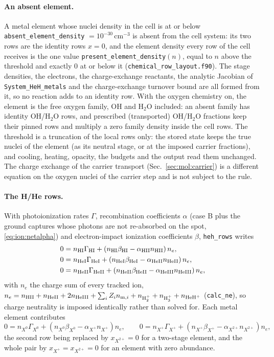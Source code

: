 \paragraph{An absent element.} A metal element whose nuclei density in the
cell is at or below \texttt{absent\_element\_density} $=10^{-30}$\,cm$^{-3}$
is absent from the cell system: its two rows are the identity rows $x=0$,
and the element density every row of the cell receives is the one value
\texttt{present\_element\_density}$(n)$, equal to $n$ above the threshold
and exactly 0 at or below it (\texttt{chemical\_row\_layout.f90}).  The stage
densities, the electrons, the charge-exchange reactants, the analytic
Jacobian of \texttt{System\_HeH\_metals} and the charge-exchange turnover
bound are all formed from it, so no reaction adds to an identity row.  With
the oxygen chemistry on, the element is the free oxygen family, OH and
H$_2$O included: an absent family has identity OH/H$_2$O rows, and
prescribed (transported) OH/H$_2$O fractions keep their pinned rows and
multiply a zero family density inside the cell rows.  The threshold is a
truncation of the local rows only: the stored state keeps the true nuclei of
the element (as its neutral stage, or at the imposed carrier fractions), and
cooling, heating, opacity, the budgets and the output read them unchanged.
The charge exchange of the carrier transport (Sec.~\ref{sec:mol:carrier})
is a different equation on the oxygen nuclei of the carrier step and is not
subject to the rule.

\paragraph{The H/He rows.} With photoionization rates $\Gamma$,
recombination coefficients $\alpha$ (case B plus the ground captures whose
photons are not re-absorbed on the spot, \eqref{eq:ion:netalpha}) and
electron-impact ionization coefficients $\beta$, \texttt{heh\_rows}
writes
\begin{align}
0 &= n_{\rm HI}\Gamma_{\rm HI}
   + \left(n_{\rm HI}\beta_{\rm HI}-\alpha_{\rm HII}n_{\rm HII}\right)n_e,
   \label{eq:ion:hrow}\\
0 &= n_{\rm HeI}\Gamma_{\rm HeI}
   + \left(n_{\rm HeI}\beta_{\rm HeI}-\alpha_{\rm HeII}n_{\rm HeII}\right)n_e,
   \label{eq:ion:herow}\\
0 &= n_{\rm HeII}\Gamma_{\rm HeII}
   + \left(n_{\rm HeII}\beta_{\rm HeII}-\alpha_{\rm HeIII}n_{\rm HeIII}\right)n_e,
   \label{eq:ion:he2row}
\end{align}
with $n_e$ the charge sum of every tracked ion,
$n_e = n_{\rm HII}+n_{\rm HeII}+2n_{\rm HeIII}+\sum_i Z_i n_{{\rm m},i}
 + n_{\rm H_2^+}+n_{\rm H_3^+}+n_{\rm HeH^+}$
(\texttt{calc\_ne}), so charge neutrality is imposed identically rather
than solved for. Each metal element contributes
\begin{equation}
0 = n_{X^0}\Gamma_{X^0}
  + \left(n_{X^0}\beta_{X^0}-\alpha_{X^+}n_{X^+}\right)n_e,
\qquad
0 = n_{X^+}\Gamma_{X^+}
  + \left(n_{X^+}\beta_{X^+}-\alpha_{X^{2+}}n_{X^{2+}}\right)n_e,
\label{eq:ion:metalrows}
\end{equation}
the second row being replaced by $x_{X^{2+}}=0$ for a two-stage element, and
the whole pair by $x_{X^+}=x_{X^{2+}}=0$ for an element with zero abundance.

